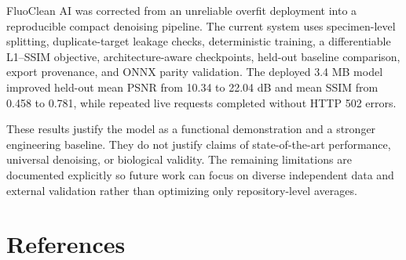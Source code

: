 \documentclass[12pt,a4paper]{report}
\begin{document}
FluoClean AI was corrected from an unreliable overfit deployment into a reproducible compact denoising pipeline. The current system uses specimen-level splitting, duplicate-target leakage checks, deterministic training, a differentiable L1--SSIM objective, architecture-aware checkpoints, held-out baseline comparison, export provenance, and ONNX parity validation. The deployed 3.4 MB model improved held-out mean PSNR from 10.34 to 22.04 dB and mean SSIM from 0.458 to 0.781, while repeated live requests completed without HTTP 502 errors.

These results justify the model as a functional demonstration and a stronger engineering baseline. They do not justify claims of state-of-the-art performance, universal denoising, or biological validity. The remaining limitations are documented explicitly so future work can focus on diverse independent data and external validation rather than optimizing only repository-level averages.

\chapter*{References}
\thispagestyle{plain}
\end{document}
